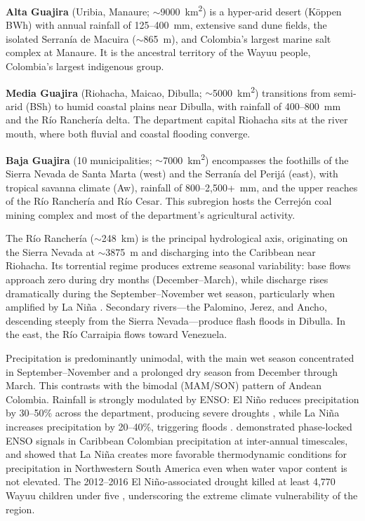 \documentclass{article}
\begin{document}
\textbf{Alta Guajira} (Uribia, Manaure; $\sim$\SI{9000}{\kilo\metre\squared}) is a hyper-arid desert (K\"oppen BWh) with annual rainfall of 125--400~mm, extensive sand dune fields, the isolated Serran\'ia de Macuira ($\sim$\SI{865}{\metre}), and Colombia's largest marine salt complex at Manaure. It is the ancestral territory of the Wayuu people, Colombia's largest indigenous group.

\textbf{Media Guajira} (Riohacha, Maicao, Dibulla; $\sim$\SI{5000}{\kilo\metre\squared}) transitions from semi-arid (BSh) to humid coastal plains near Dibulla, with rainfall of 400--800~mm and the R\'io Rancher\'ia delta. The department capital Riohacha sits at the river mouth, where both fluvial and coastal flooding converge.

\textbf{Baja Guajira} (10 municipalities; $\sim$\SI{7000}{\kilo\metre\squared}) encompasses the foothills of the Sierra Nevada de Santa Marta (west) and the Serran\'ia del Perij\'a (east), with tropical savanna climate (Aw), rainfall of 800--2,500+~mm, and the upper reaches of the R\'io Rancher\'ia and R\'io Cesar. This subregion hosts the Cerrej\'on coal mining complex and most of the department's agricultural activity.

The R\'io Rancher\'ia ($\sim$\SI{248}{\kilo\metre}) is the principal hydrological axis, originating on the Sierra Nevada at $\sim$\SI{3875}{\metre} and discharging into the Caribbean near Riohacha. Its torrential regime produces extreme seasonal variability: base flows approach zero during dry months (December--March), while discharge rises dramatically during the September--November wet season, particularly when amplified by La Ni\~na \citep{PerezMontiel2022}. Secondary rivers---the Palomino, Jerez, and Ancho, descending steeply from the Sierra Nevada---produce flash floods in Dibulla. In the east, the R\'io Carraipia flows toward Venezuela.

Precipitation is predominantly unimodal, with the main wet season concentrated in September--November and a prolonged dry season from December through March. This contrasts with the bimodal (MAM/SON) pattern of Andean Colombia. Rainfall is strongly modulated by ENSO: El Ni\~no reduces precipitation by 30--50\% across the department, producing severe droughts \citep{MeraGomez2021}, while La Ni\~na increases precipitation by 20--40\%, triggering floods \citep{Hoyos2013, SedanoCruz2017}. \citet{SalasENSO2024} demonstrated phase-locked ENSO signals in Caribbean Colombian precipitation at inter-annual timescales, and \citet{RuizVasquez2024} showed that La Ni\~na creates more favorable thermodynamic conditions for precipitation in Northwestern South America even when water vapor content is not elevated. The 2012--2016 El Ni\~no-associated drought killed at least 4,770 Wayuu children under five \citep{Contreras2020}, underscoring the extreme climate vulnerability of the region.
\end{document}
